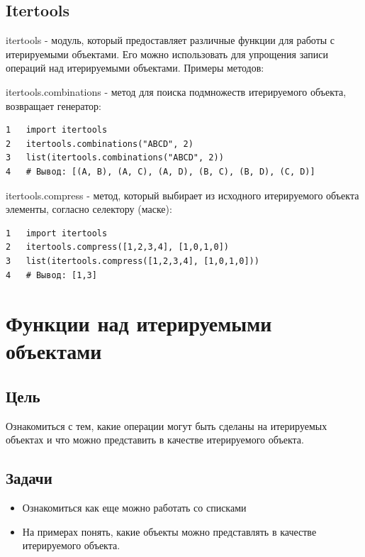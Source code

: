 \documentclass[12pt, a4paper]{article}
\begin{document}
\subsection{Itertools}

itertools - модуль, который предоставляет различные функции 
для работы с итерируемыми объектами. Его можно использовать
для упрощения записи операций над итерируемыми объектами.
Примеры методов:

\vspace{1em}

itertools.combinations - метод для поиска подмножеств
итерируемого объекта, возвращает генератор: 
\begin{verbatim}
1   import itertools    
2   itertools.combinations("ABCD", 2)
3   list(itertools.combinations("ABCD", 2))
4   # Вывод: [(A, B), (A, C), (A, D), (B, C), (B, D), (C, D)]
\end{verbatim}

\vspace{1em}

itertools.compress - метод, который выбирает из исходного
итерируемого объекта элементы, согласно селектору (маске):
\begin{verbatim}
1   import itertools    
2   itertools.compress([1,2,3,4], [1,0,1,0])
3   list(itertools.compress([1,2,3,4], [1,0,1,0]))
4   # Вывод: [1,3]
\end{verbatim}
    
\vspace{1em}

\section{Функции над итерируемыми объектами}

\subsection{Цель}

Ознакомиться с тем, какие операции могут быть сделаны
на итерируемых объектах и что можно представить в качестве
итерируемого объекта.

\subsection{Задачи}

\begin{itemize}
    \item Ознакомиться как еще можно работать со списками
    \item На примерах понять, какие объекты можно представлять
    в качестве итерируемого объекта.
\end{itemize}
\end{document}
